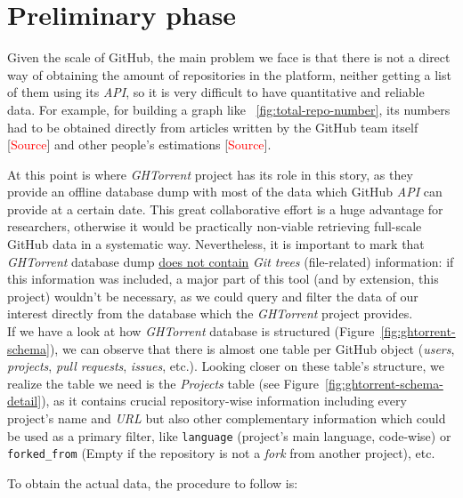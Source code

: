 \documentclass[a4paper, 12pt]{book}
\begin{document}
\section{Preliminary phase}
\label{sec:preliminary-phase}
Given the scale of GitHub, the main problem we face is that there is not a direct way
of obtaining the amount of repositories in the platform, neither getting a list of them using its \textit{API}, so it is
very difficult to have quantitative and reliable data. For example, for building a graph like ~\ref{fig:total-repo-number},
its numbers had to be obtained directly from articles written by the GitHub team itself [\textcolor{red}{Source}]
and other people's estimations [\textcolor{red}{Source}].\par
At this point is where \emph{GHTorrent} project has its role in this story, as they provide an offline database dump with most
of the data which GitHub \textit{API} can provide at a certain date. This great collaborative effort is a huge advantage
for researchers, otherwise it would be practically non-viable retrieving full-scale GitHub data in a systematic way.
Nevertheless, it is important to mark that \emph{GHTorrent} database dump \underline{does not contain} \textit{Git trees}
(file-related) information: if this information was included, a major part of this tool (and by extension, this project) wouldn't
be necessary, as we could query and filter the data of our interest directly from the database which the \emph{GHTorrent} project provides.\\
If we have a look at how \emph{GHTorrent} database is structured (Figure~\ref{fig:ghtorrent-schema}), we can observe that
there is almost one table per GitHub object (\textit{users}, \textit{projects}, \textit{pull requests}, \textit{issues}, etc.).
Looking closer on these table's structure, we realize the table we need is the \emph{Projects} table
(see Figure~\ref{fig:ghtorrent-schema-detail}), as it contains crucial repository-wise information including every project's name
and \textit{URL} but also other complementary information which could be used as a primary filter, like \texttt{language} (project's main language,
code-wise) or \texttt{forked\_from} (Empty if the repository is not a \textit{fork} from another project), etc.\par
To obtain the actual data, the procedure to follow is:
\end{document}
